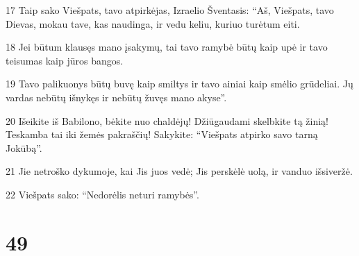 \par 17 Taip sako Viešpats, tavo atpirkėjas, Izraelio Šventasis: “Aš, Viešpats, tavo Dievas, mokau tave, kas naudinga, ir vedu keliu, kuriuo turėtum eiti. 
\par 18 Jei būtum klausęs mano įsakymų, tai tavo ramybė būtų kaip upė ir tavo teisumas kaip jūros bangos. 
\par 19 Tavo palikuonys būtų buvę kaip smiltys ir tavo ainiai kaip smėlio grūdeliai. Jų vardas nebūtų išnykęs ir nebūtų žuvęs mano akyse”. 
\par 20 Išeikite iš Babilono, bėkite nuo chaldėjų! Džiūgaudami skelbkite tą žinią! Teskamba tai iki žemės pakraščių! Sakykite: “Viešpats atpirko savo tarną Jokūbą”. 
\par 21 Jie netroško dykumoje, kai Jis juos vedė; Jis perskėlė uolą, ir vanduo išsiveržė. 
\par 22 Viešpats sako: “Nedorėlis neturi ramybės”.



\chapter{49}


